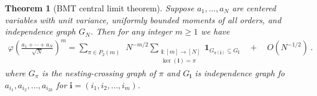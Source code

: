\documentclass[a4paper,12pt]{extarticle}
\newtheorem{thm}{Theorem}[section]
\theoremstyle{definition}
\theoremstyle{remark}
\begin{document}
\begin{thm}[BMT central limit theorem]\label{thm_bmt_clt}
	Suppose $a_1,\ldots,a_N$ are centered variables with unit variance, uniformly bounded  moments of all orders, and independence graph $G_N$. 
	Then for any integer $m\geq 1$ we have 
	\begin{align}\label{momentsCLT}
		\varphi \left(\frac{a_1 + \cdots + a_N}{\sqrt{N}}\right)^m
		=
		\sum_{\pi \in P_2(m)}  \ \ 
		N^{-m/2}
		\sum_{\substack{ {\bm i}:[m]\rightarrow [N] \\ \ker({\bm i})=\pi}}  
		\bm{1}_{G_{\pi(\bm{i})}  \subseteq G_{\bm i}}  
		\quad	+ \quad O(N^{-1/2}) \ .  
	\end{align}
	where $G_\pi$ is the nesting-crossing graph of $\pi$ and $G_{{\bm i}}$ is independence graph fo $a_{i_1},a_{i_2},\ldots,a_{i_{2k}}$ for ${\bm i} = (i_1,i_2,\ldots,i_{m})$. 
\end{thm}
\end{document}
